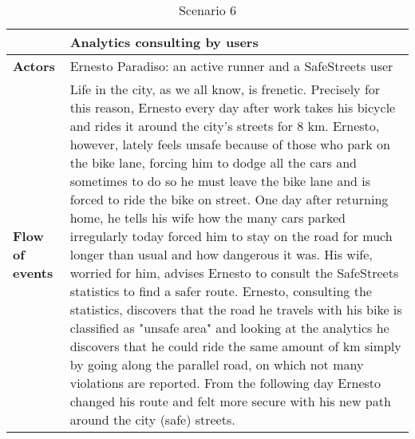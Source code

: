 \begin{table}[!htbp]
	\centering
\begin{tabular}{lp{9cm}}
\hline
\bf\large  &\bf\large Analytics consulting by users\\
\hline
\hline

\bf Actors&Ernesto Paradiso: an active runner and a SafeStreets user\\
\hline
\bf Flow of events&
Life in the city, as we all know, is frenetic. Precisely for this reason, Ernesto every day after work takes his bicycle and rides it around the city's streets for 8 km.
Ernesto, however, lately feels unsafe because of those who park on the bike lane, forcing him to dodge all the cars and sometimes to do so he must leave the bike lane and is forced to ride the bike on street.
One day after returning home, he tells his wife how the many cars parked irregularly today forced him to stay on the road for much longer than usual and how dangerous it was.
His wife, worried for him, advises Ernesto to consult the SafeStreets statistics to find a safer route.
Ernesto, consulting the statistics, discovers that the road he travels with his bike is classified as "unsafe area" and looking at the analytics he discovers that he could ride the same amount of km simply by going along the parallel road, on which not many violations are reported.
From the following day Ernesto changed his route and felt more secure with his new path around the city (safe) streets.
\end{tabular}
\caption{Scenario 6} 
\label{tab:scenariosix}
\end{table}